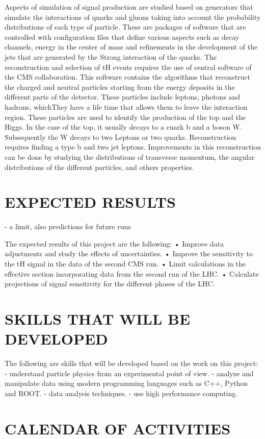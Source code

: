 \documentclass[final,3p]{CSP}
\begin{document}
Aspects of simulation of signal production are studied based on generators that simulate the interactions of quarks and gluons taking 
into account the probability distributions of each type of particle. These are packages of software that are controlled with 
configuration files that define various aspects such as decay channels, energy in the center of mass and refinements in the development 
of the jets that are generated by the Strong interaction of the quarks. The reconstruction and selection of tH events requires the use 
of central software of the CMS collaboration. This software contains the algorithms that reconstruct the charged and neutral particles 
starting from the energy deposits in the different parts of the detector. These particles include leptons, photons and hadrons, 
whichThey have a life time that allows them to leave the interaction region. These particles are used to identify the production of the 
top and the Higgs. In the case of the top, it usually decays to a cuark b and a boson W. Subsequently the W decays to two Leptons or two 
quarks. Reconstruction requires finding a type b and two jet leptons. Improvements in this reconstruction can be done by studying the 
distributions of transverse momentum, the angular distributions of the different particles, and others properties.

\section{EXPECTED RESULTS}
- a limit, also predictions for future runs

The expected results of this project are the following:
• Improve data adjustments and study the effects of uncertainties.
• Improve the sensitivity to the tH signal in the data of the second CMS run.
• Limit calculations in the effective section incorporating data from the second
run of the LHC.
• Calculate projections of signal sensitivity for the different phases of the LHC.


\cleardoublepage



\appendix
\section{SKILLS THAT WILL BE DEVELOPED}
The following are skills that will be developed based on the work on this project:
- understand particle physics from an experimental point of view.
- analyze and manipulate data using modern programming languages such as C++, Python and ROOT.
- data analysis techniques.
- use high performance computing.

\section{CALENDAR OF ACTIVITIES}
\end{document}

